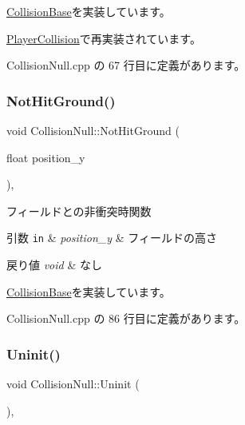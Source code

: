\mbox{\hyperlink{class_collision_base_a9b64fc5c3f2aac2a05296985ef799fb1}{Collision\+Base}}を実装しています。



\mbox{\hyperlink{class_player_collision_a21b8f825ea142024212ab5fe3f427ab0}{Player\+Collision}}で再実装されています。



 Collision\+Null.\+cpp の 67 行目に定義があります。

\mbox{\label{class_collision_null_a77004653a17a43a8a4809297e6c71422}} 
\subsubsection{\texorpdfstring{Not\+Hit\+Ground()}{NotHitGround()}}
{\footnotesize\ttfamily void Collision\+Null\+::\+Not\+Hit\+Ground (\begin{DoxyParamCaption}\item[{float}]{position\+\_\+y }\end{DoxyParamCaption})\hspace{0.3cm}{\ttfamily [override]}, {\ttfamily [virtual]}}



フィールドとの非衝突時関数 


\begin{DoxyParams}[1]{引数}
\mbox{\tt in}  & {\em position\+\_\+y} & フィールドの高さ \\
\hline
\end{DoxyParams}

\begin{DoxyRetVals}{戻り値}
{\em void} & なし \\
\hline
\end{DoxyRetVals}


\mbox{\hyperlink{class_collision_base_ac1ed5b1c0c9b6b70b432e6656f9c4b45}{Collision\+Base}}を実装しています。



 Collision\+Null.\+cpp の 86 行目に定義があります。

\mbox{\label{class_collision_null_aafac3fdab43845465fd1e0198c423ccf}} 
\subsubsection{\texorpdfstring{Uninit()}{Uninit()}}
{\footnotesize\ttfamily void Collision\+Null\+::\+Uninit (\begin{DoxyParamCaption}{ }\end{DoxyParamCaption})\hspace{0.3cm}{\ttfamily [override]}, {\ttfamily [virtual]}}



